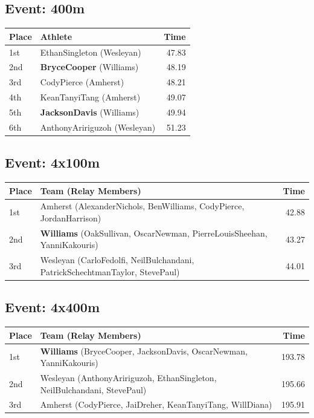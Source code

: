 \documentclass[11pt]{article}
\begin{document}
\subsection*{Event: 400m}
\begin{tabularx}{\linewidth}{lXr}
\toprule
Place & Athlete & Time \\
\midrule
1st & EthanSingleton (Wesleyan) & 47.83 \\
2nd & \textbf{BryceCooper} (Williams) & 48.19 \\
3rd & CodyPierce (Amherst) & 48.21 \\
4th & KeanTanyiTang (Amherst) & 49.07 \\
5th & \textbf{JacksonDavis} (Williams) & 49.94 \\
6th & AnthonyAririguzoh (Wesleyan) & 51.23 \\
\bottomrule
\end{tabularx}

\subsection*{Event: 4x100m}
\begin{tabularx}{\linewidth}{lXr}
\toprule
Place & Team (Relay Members) & Time \\
\midrule
1st & Amherst (AlexanderNichols, BenWilliams, CodyPierce, JordanHarrison) & 42.88 \\
2nd & \textbf{Williams} (OakSullivan, OscarNewman, PierreLouisSheehan, YanniKakouris) & 43.27 \\
3rd & Wesleyan (CarloFedolfi, NeilBulchandani, PatrickSchechtmanTaylor, StevePaul) & 44.01 \\
\bottomrule
\end{tabularx}

\subsection*{Event: 4x400m}
\begin{tabularx}{\linewidth}{lXr}
\toprule
Place & Team (Relay Members) & Time \\
\midrule
1st & \textbf{Williams} (BryceCooper, JacksonDavis, OscarNewman, YanniKakouris) & 193.78 \\
2nd & Wesleyan (AnthonyAririguzoh, EthanSingleton, NeilBulchandani, StevePaul) & 195.66 \\
3rd & Amherst (CodyPierce, JaiDreher, KeanTanyiTang, WillDiana) & 195.91 \\
\bottomrule
\end{tabularx}
\end{document}
